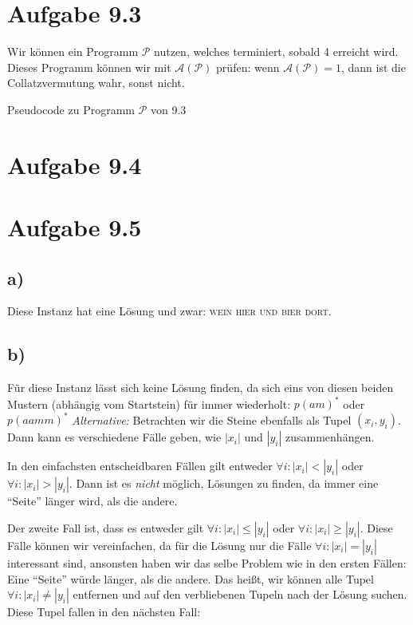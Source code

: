 \documentclass{article}
\begin{document}
\section*{Aufgabe 9.3}
Wir können ein Programm $\mathcal{P}$ nutzen, welches terminiert, sobald 4 erreicht wird. Dieses Programm können wir mit $\mathcal{A}(\mathcal{P})$ prüfen: wenn $\mathcal{A}(\mathcal{P}) = 1$, dann ist die Collatzvermutung wahr, sonst nicht.
\begin{algorithm}[ht]
  \caption{Pseudocode zu Programm $\mathcal{P}$ von 9.3}
\end{algorithm}

\section*{Aufgabe 9.4}

\section*{Aufgabe 9.5}
\subsection*{a)}
Diese Instanz hat eine Lösung und zwar: \textsc{wein hier und bier dort}.
\subsection*{b)}
Für diese Instanz lässt sich keine Lösung finden, da sich eins von diesen beiden Mustern (abhängig vom Startstein) für immer wiederholt: $p(am)^*$ oder $p(aamm)^*$
\bigskip
\emph{Alternative:} Betrachten wir die Steine ebenfalls als Tupel $(x_i,y_i)$. Dann kann es verschiedene Fälle geben, wie $|x_i|$ und $|y_i|$ zusammenhängen.

In den einfachsten entscheidbaren Fällen gilt entweder $\forall i: |x_i| < |y_i|$ oder $\forall i: |x_i| > |y_i|$. Dann ist es \emph{nicht} möglich, Lösungen zu finden, da immer eine "`Seite"' länger wird, als die andere.

Der zweite Fall ist, dass es entweder gilt $\forall i: |x_i| \leq |y_i|$ oder $\forall i: |x_i| \geq |y_i|$. Diese Fälle können wir vereinfachen, da für die Lösung nur die Fälle $\forall i: |x_i| = |y_i|$ interessant sind, ansonsten haben wir das selbe Problem wie in den ersten Fällen: Eine "`Seite"' würde länger, als die andere. Das heißt, wir können alle Tupel $\forall i: |x_i| \neq |y_i|$ entfernen und auf den verbliebenen Tupeln nach der Lösung suchen. Diese Tupel fallen in den nächsten Fall:
\end{document}
